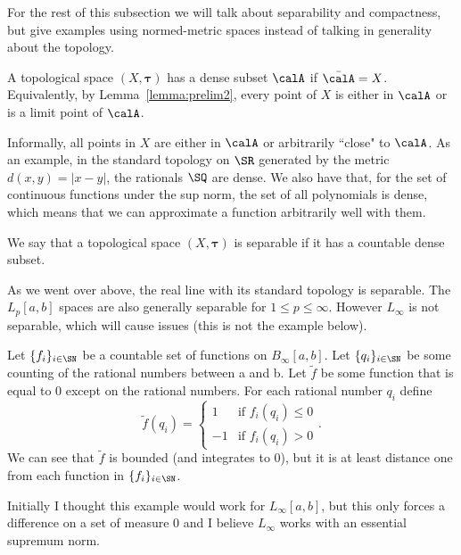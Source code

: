For the rest of this subsection we will talk about separability and compactness, but give examples using normed-metric spaces instead of talking in generality about the topology.

\begin{definition}
	\label{def:dense}
	A topological space \((X,\boldsymbol{\tau})\) has a dense subset \(\calA\) if  \(\bar{\calA} = X\). Equivalently, by Lemma~\ref{lemma:prelim2}, every point of  \(X\) is either in  \(\calA\) or is a limit point of  \(\calA\).
\end{definition}
Informally, all points in \(X\) are either in \(\calA\) or arbitrarily ``close" to \(\calA\). As an example, in the standard topology on \(\SR\) generated by the metric \(d(x,y) = |x-y|\), the rationals \(\SQ\) are dense. We also have that, for the set of continuous functions under the sup norm, the set of all polynomials is dense, which means that we can approximate a function arbitrarily well with them.

\begin{definition}
	\label{def:seperable}
	We say that a topological space \((X,\boldsymbol{\tau})\) is separable if it has a countable dense subset.
\end{definition}
As we went over above, the real line with its standard topology is separable. The \(L_p[a,b]\) spaces are also generally separable for  \(1 \leq p \leq \infty\). However \(L_\infty\) is not separable, which will cause issues (this is not the example below).


\begin{example}
	\label{ex:notseperable}
	Let \(\{f_i\}_{i\in\SN}\) be a countable set of functions on \(B_\infty[a,b]\). Let  \(\{q_i\}_{i\in\SN}\) be some counting of the rational numbers between a and b. Let \(\tilde f\) be some function that is equal to 0 except on the rational numbers. For each rational number  \(q_i\) define 
	 \[
		 \tilde{f}(q_i) = \begin{cases}
			 1 & \text{if }f_i(q_i) \leq 0 \\
			 -1 & \text{if }f_i(q_i) > 0
	    \end{cases}
	.\] 
	We can see that \(\tilde{f}\) is bounded (and integrates to 0), but it is at least distance one from each function in \(\{f_i\}_{i\in\SN}\).
\end{example}

Initially I thought this example would work for \(L_\infty[a,b]\), but this only forces a difference on a set of measure 0 and I believe \(L_\infty\) works with an essential supremum norm.

